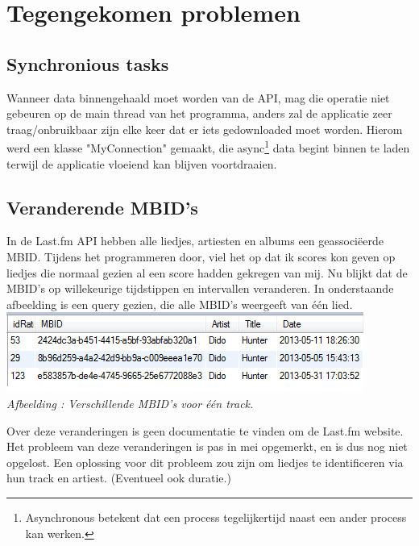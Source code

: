 \documentclass[11pt,a4paper]{article}
\newcounter{figc}
\newcommand{\figID} {%
   \stepcounter{figc}%
   \thefigc}
\begin{document}




	\newpage
\section{Tegengekomen problemen}
\label{sec:Tegengekomen problemen}

	\subsection{Synchronious tasks}
	\label{sec:Synchronious tasks}
	Wanneer data binnengehaald moet worden van de API, mag die operatie niet gebeuren op de main thread van het programma, anders zal de applicatie zeer traag/onbruikbaar zijn elke keer dat er iets gedownloaded moet worden. Hierom werd een klasse "MyConnection" gemaakt, die async\footnote{Asynchronous betekent dat een process tegelijkertijd naast een ander process kan werken.} data begint binnen te laden terwijl de applicatie vloeiend kan blijven voortdraaien.
	

		
	\subsection{Veranderende MBID's}
	\label{sec:veranderendeMBID}
	In de Last.fm API hebben alle liedjes, artiesten en albums een geassociëerde MBID. Tijdens het programmeren door, viel het op dat ik scores kon geven op liedjes die normaal gezien al een score hadden gekregen van mij. Nu blijkt dat de MBID's op willekeurige tijdstippen en intervallen veranderen. In onderstaande afbeelding is een query gezien, die alle MBID's weergeeft van één lied. \\
	
	\includegraphics[scale=1]{Pictures/mbid_change.png} \\
	\small \textit{Afbeelding \figID : Verschillende MBID's voor één track.} \normalsize \newline
	
	Over deze veranderingen is geen documentatie te vinden om de Last.fm website. Het probleem van deze veranderingen is pas in mei opgemerkt, en is dus nog niet opgelost. Een oplossing voor dit probleem zou zijn om liedjes te identificeren via hun track en artiest. (Eventueel ook duratie.) 
\end{document}
